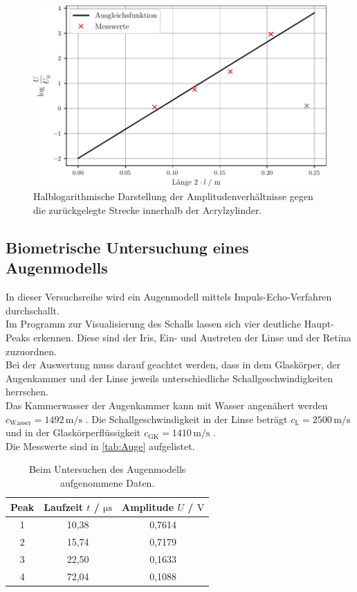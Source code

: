   \begin{figure}
    \centering
    \includegraphics[width=15cm]{messwerte/Daempfung.pdf}
    \caption{Halblogarithmische Darstellung der Amplitudenverhältnisse gegen die zurückgelegte Strecke innerhalb der Acrylzylinder.}
    \label{fig:Daempfung}
  \end{figure}

\subsection{Biometrische Untersuchung eines Augenmodells}

In dieser Versuchsreihe wird ein Augenmodell mittels Impuls-Echo-Verfahren durchschallt.\\ 
Im Programm zur Visualisierung des Schalls lassen sich vier deutliche Haupt-Peaks erkennen.
Diese sind der Iris, Ein- und Austreten der Linse und der Retina zuzuordnen.\\
Bei der Auswertung muss darauf geachtet werden, dass in dem Glaskörper, der Augenkammer und der 
Linse jeweils unterschiedliche Schallgeschwindigkeiten herrschen.\\
Das Kammerwasser der Augenkammer kann mit Wasser angenähert werden $c_{\mathrm{Wasser}} = 1492 \, \si{\meter\per\second}$  \cite{medizinphysik}.
Die Schallgeschwindigkeit in der Linse beträgt $c_{\mathrm{L}} = 2500 \, \si{\meter\per\second}$ und in der
Glaskörperflüssigkeit $c_{\mathrm{GK}} = 1410 \, \si{\meter\per\second}$ \cite{sample}.\\
Die Messwerte sind in \autoref{tab:Auge} aufgelistet.

\begin{table}
  \centering
  \caption{Beim Untersuchen des Augenmodells aufgenommene Daten.}
  \label{tab:Auge}
  \begin{tabular}{c | c c}
    Peak & Laufzeit $t$ / $\si{\micro\second}$ & Amplitude $U$ / $\si{\volt}$ \\
      \midrule
      1   & 10,38 & 0,7614\\
      2   & 15,74 & 0,7179\\
      3   & 22,50 & 0,1633\\
      4   & 72,04 & 0,1088\\
      \bottomrule
    \end{tabular}
\end{table}

